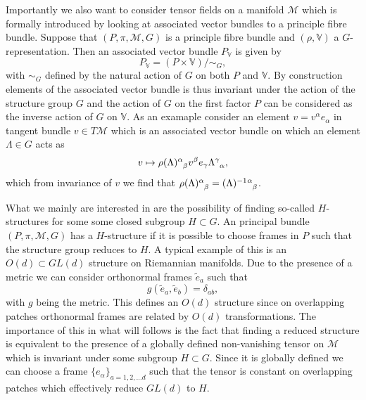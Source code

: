 Importantly we also want to consider tensor fields on a manifold $\mathcal{M}$ which is formally introduced by looking at associated vector bundles to a principle fibre bundle. Suppose that $(P,\pi,\mathcal{M},G)$ is a principle fibre bundle and $(\rho,\mathbb{V})$ a $G$-representation. Then an associated vector bundle $P_{\mathbb{V}}$ is given by 
\begin{equation}
    P_{\mathbb{V}} = (P\times \mathbb{V})/\sim_G,
\end{equation}
with $\sim_G$ defined by the natural action of $G$ on both $P$ and $\mathbb{V}$. By construction elements of the associated vector bundle is thus invariant under the action of the structure group $G$ and the action of $G$ on the first factor $P$ can be considered as the inverse action of $G$ on $\mathbb{V}$. As an examaple consider an element $v=v^\alpha e_\alpha$ in tangent bundle $v\in T\mathcal{M}$ which is an associated vector bundle on which an element $\Lambda\in G$ acts as 
\begin{equation}
    v \mapsto \tensor{\rho(\Lambda)}{^\alpha_\beta} v^{\beta}e_\gamma \tensor{\Lambda}{^\gamma_\alpha},
\end{equation}
which from invariance of $v$ we find that $\tensor{\rho(\Lambda)}{^\alpha_\beta}= \tensor{(\Lambda)}{^{-1}}\tensor{}{^{\alpha}_\beta}$. 

What we mainly are interested in are the possibility of finding so-called $H$-structures for some some closed subgroup $H\subset G$. An principal bundle $(P,\pi,\mathcal{M},G)$ has a $H$-structure if it is possible to choose frames in $P$ such that the structure group reduces to $H$. A typical example of this is an $O(d)\subset GL(d)$ structure on Riemannian manifolds. Due to the presence of a metric we can consider orthonormal frames $\tilde{e}_a$ such that 
\begin{equation}
    g(\tilde{e}_a,\tilde{e}_b) = \delta_{ab},
\end{equation}
with $g$ being the metric. This defines an $O(d)$ structure since on overlapping patches orthonormal frames are related by $O(d)$ transformations. The importance of this in what will follows is the fact that finding a reduced structure is equivalent to the presence of a globally defined non-vanishing tensor on $\mathcal{M}$ which is invariant under some subgroup $H\subset G$. Since it is globally defined we can choose a frame $\{e_{\alpha}\}_{a=1,2,\ldots d}$ such that the tensor is constant on overlapping patches which effectively reduce $GL(d)$ to $H$. 


